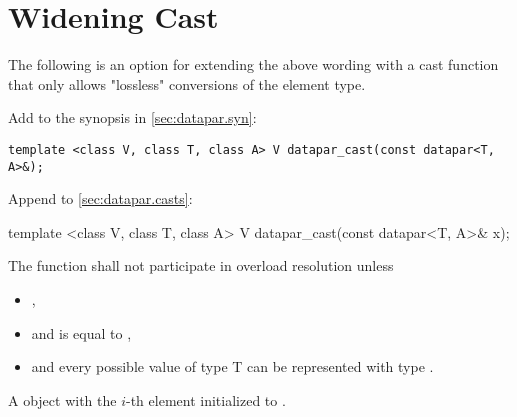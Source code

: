 \section{Widening Cast}\label{sec:widen}
The following is an option for extending the above wording with a cast function that only allows
"lossless" conversions of the element type.

Add to the synopsis in \ref{sec:datapar.syn}:
\begin{wgText}
  \begin{lstlisting}[style=Vc]
    template <class V, class T, class A> V datapar_cast(const datapar<T, A>&);
  \end{lstlisting}
\end{wgText}

Append to \ref{sec:datapar.casts}:
\begin{wgText}
  \begin{itemdecl}
    template <class V, class T, class A> V datapar_cast(const datapar<T, A>& x);
  \end{itemdecl}
  \begin{itemdescr}
    \pnum\remarks The function shall not participate in overload resolution unless
    \begin{itemize}
      \item {},
      \item and  is equal to ,
      \item and every possible value of type \type T can be represented with type \datapar\code{::}.
    \end{itemize}
    \pnum\returns A \datapar object with the $i$-th element initialized to .
  \end{itemdescr}
\end{wgText}
